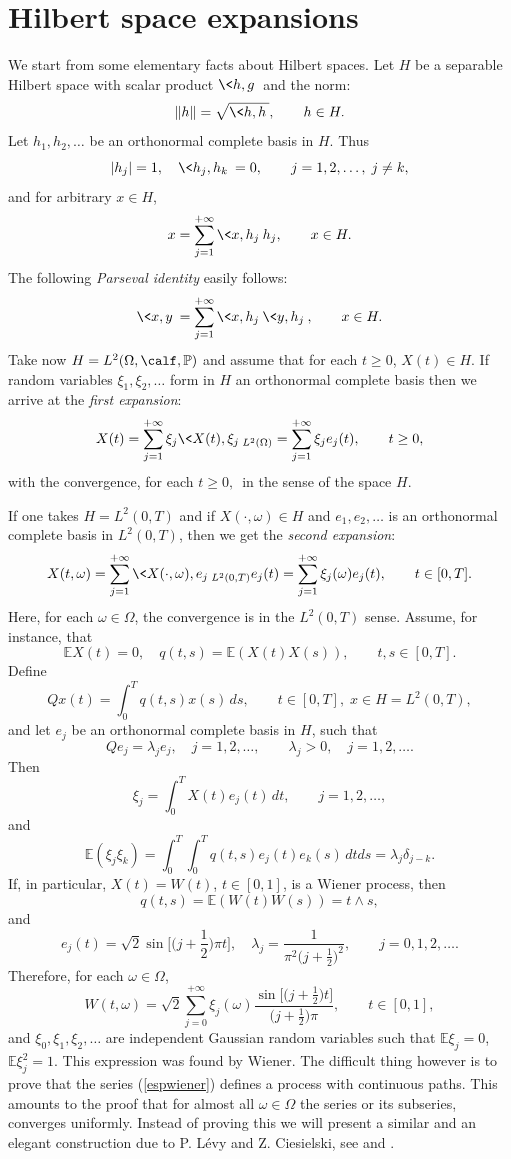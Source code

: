 \documentclass[preprint]{imsart}
\def\P{\mathbb P}
\def\E{\mathbb E}
\begin{document}
{\section{Hilbert space expansions}
We start from some elementary facts about Hilbert spaces.
Let $H$ be a separable Hilbert space with scalar product
$\<h,g\>$ and the norm:
$$
\|h\|=\sqrt{\<h,h\>},\qquad h\in H.
$$
Let $h_1,h_2,\ldots$ be an orthonormal complete basis in $H$. Thus
$$
|h_j|=1,\quad \<h_j,h_k\>=0,\qquad  j=1,2,\ldots,\; j\ne k,
$$
and for arbitrary $x\in H$,
$$
  x=\sum_{j=1}^{+\infty} \<x,h_j\>h_j, \qquad x\in H.
$$
The following {\it Parseval identity}  easily follows:
$$
\<x, y\>=\sum_{j=1}^{+\infty} \<x,h_j\>\<y,h_j\>, \qquad x\in H.
$$
Take now $H=L^2(\Omega,\calf,\P)$ and assume that for each
$t\geq 0$, $X(t)\in H$.
If random variables $\xi_1,\xi_2,\ldots$ form in $H$ an
 orthonormal complete basis then we arrive at the {\em first
expansion}:
$$
X(t)=\sum_{j=1}^{+\infty} \xi_j\<X(t),\xi_j\>_{L^2(\Omega)}
=\sum_{j=1}^{+\infty} \xi_j
e_j(t), \qquad t\ge0,
$$
with the convergence, for each $t\geq 0,$ \,in the sense of the space $H$.

If one takes $H=L^2(0,T)$ and if $X(\cdot,\omega)\in H$
and $e_1,e_2,\ldots$ is an orthonormal complete basis  in $L^2(0,T)$,
then we get the {\em second expansion}:
$$
X(t,\omega)=\sum_{j=1}^{+\infty}\<X(\cdot,\omega),e_j\>_{L^2(0,T)}e_j(t)
=\sum_{j=1}^{+\infty}\xi_j(\omega)e_j(t), \qquad t\in[0,T].
$$
Here, for each $\omega \in \Omega $, the convergence is in the $L^2(0,T)$ sense.
Assume, for instance, that
$$
\E X(t)=0,\quad q(t,s)=\E (X(t)X(s)),\qquad t,s\in[0,T].
$$
Define
$$
Qx(t)=\int_0^T q(t,s)x(s)\,ds,\qquad t\in[0,T],\; x\in H= L^2(0,T),
$$
and let $e_j$ be an orthonormal complete basis in $H$, such that
$$
Qe_j=\lambda_je_j,\quad j=1,2,\ldots,\qquad  \lambda_j>0,
\quad j=1,2,\ldots .
$$
Then
$$
\xi_j=\int_0^T X(t)e_j(t)\,dt, \qquad j=1,2,\ldots ,
$$
and
$$
\E(\xi_j\xi_k)=\int_0^T \int_0^T q(t,s)e_j(t)e_k(s)\,dtds=
\lambda_j \delta_{j-k}.
$$
If, in particular, $X(t)=W(t)$, $t\in[0,1]$, is a Wiener process, then
$$
q(t,s)=\E(W(t)W(s))=t\wedge s,
$$
and
$$
e_j(t)=\sqrt2 \sin\Big[\Big(j+\frac12\Big)\pi t\Big],
\quad \lambda_j=\frac{1}{\pi^2\Big(j+\frac12\Big)^2},
\qquad j=0,1,2,\ldots .
$$
Therefore, for each $\omega \in \Omega $,
\begin{equation}\label{espwiener}
W(t, \omega)=\sqrt2 \sum_{j=0}^{+\infty}\xi_j(\omega)
\frac{\sin\Big[\Big(j+\frac12\Big)t\Big]}{\Big(j+\frac12\Big)\pi}
,\qquad t\in[0,1],
\end{equation}
and
$ \xi_0,\xi_1,\xi_2,\ldots $
are independent Gaussian random variables such that
 $\E \xi _j =0$, $\E\xi _j^2=1$.
This expression was found by Wiener.
The difficult thing however is to prove that the series
(\ref{espwiener}) defines a process with continuous paths.
This amounts to the proof that for almost all $\omega\in\Omega$
the series or its  subseries, converges uniformly. Instead of proving this we will
present a similar and an elegant construction due to P. L\'evy and Z. Ciesielski, see \cite{bib11} and \cite{bib12}.

}
\end{document}
